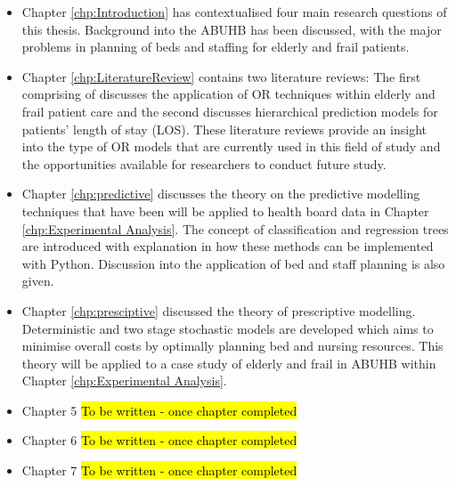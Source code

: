 \documentclass[../thesis.tex]{subfiles}
\begin{document}
\begin{itemize}
\item Chapter \ref{chp:Introduction} has contextualised four main research questions of this thesis. Background into the ABUHB has been discussed, with the major problems in planning of beds and staffing for elderly and frail patients.
    \item Chapter \ref{chp:LiteratureReview} contains two literature reviews: The first comprising of \cite{Williams} discusses the application of OR techniques within elderly and frail patient care and the second discusses hierarchical prediction models for patients' length of stay (LOS). These literature reviews provide an insight into the type of OR models that are currently used in this field of study and the opportunities available for researchers to conduct future study.
    
    \item Chapter \ref{chp:predictive} discusses the theory on the predictive modelling techniques that have been will be applied to health board data in Chapter \ref{chp:Experimental Analysis}. The concept of classification and regression trees are introduced with explanation in how these methods can be implemented with Python. Discussion into the application of bed and staff planning is also given.
    
    \item Chapter \ref{chp:presciptive} discussed the theory of prescriptive modelling. Deterministic and two stage stochastic models are developed which aims to minimise overall costs by optimally planning bed and nursing resources. This theory will be applied to a case study of elderly and frail in ABUHB within Chapter \ref{chp:Experimental Analysis}.

    
    \item Chapter 5 \hl{To be written - once chapter completed}    
    \item Chapter 6 \hl{To be written - once chapter completed}
    \item Chapter 7 \hl{To be written - once chapter completed}
    
\end{itemize}
\end{document}
